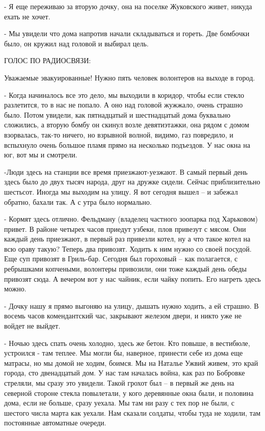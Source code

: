 - Я еще переживаю за вторую дочку, она на поселке Жуковского живет, никуда
ехать не хочет.

- Мы увидели что дома напротив начали складываться  и гореть. Две бомбочки
было, он кружил над головой и выбирал цель.

ГОЛОС ПО РАДИОСВЯЗИ:

Уважаемые эвакуированные! Нужно пять человек волонтеров на выходе в город.

- Когда начиналось все это дело, мы выходили в коридор, чтобы если стекло
разлетится, то в нас не попало. А оно над головой жужжало, очень страшно было.
Потом увидели, как пятнадцатый и шестнадцатый дома буквально сложились, а
вторую бомбу он скинул возле девятиэтажки, она рядом с домом взорвалась, так-то
ничего, но взрывной волной, видимо, газ повредило, и вспыхнуло очень большое
пламя прямо на несколько подъездов. У нас окна на юг, вот мы и смотрели.


-Люди здесь на станции все время приезжают-уезжают. В самый первый день здесь
было до двух тысяч народа, друг на дружке сидели. Сейчас приблизительно
шестьсот. Иногда мы выходим на улицу. Я вот сегодня вышел – и забежал обратно,
бахали так. А с утра было нормально.

- Кормят здесь отлично. Фельдману (владелец частного зоопарка под Харьковом)
привет. В районе четырех часов приедут узбеки, плов привезут с мясом. Они
каждый день приезжают, в первый раз привезли котел, ну а что такое котел на всю
ораву такую? Теперь два привозят. Ходить к ним нужно со своей посудой. Еще суп
привозят в Гриль-бар. Сегодня был гороховый – как полагается, с ребрышками
копчеными, волонтеры привозили, они тоже каждый день обеды привозят сюда. А
вечером вот у нас чайник, если чайку попить. Его нагреть здесь можно. 

- Дочку нашу я прямо выгоняю на улицу, дышать нужно ходить, а ей страшно. В
восемь часов комендантский час, закрывают железом двери, и никто уже не войдет
не выйдет.

- Ночью здесь спать очень холодно, здесь же бетон. Кто повыше, в вестибюле,
устроился - там теплее. Мы могли бы, наверное, принести себе из дома еще
матрасы, но мы домой не ходим, боимся. Мы на Наталье Ужвий живем, это край
города, сто двенадцатый дом. У нас там началась война, как раз по Бобровке
стреляли, мы сразу это увидели. Такой грохот был – в первый же день на северной
стороне стекла повылетали, у кого деревянные окна были, и половина дома, если
не больше, сразу уехала. Мы там ни разу с тех пор не были, с шестого числа
марта как уехали. Нам сказали солдаты, чтобы туда не ходили, там постоянные
автоматные очереди.

